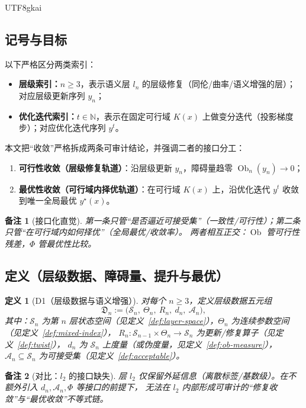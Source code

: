 \documentclass[12pt]{article}
\newtheorem{definition}{定义}[section]
\newtheorem{remark}{备注}[section]
\newcommand{\Ob}{\operatorname{Ob}}
\begin{document}
\begin{CJK*}{UTF8}{gkai}
\subsection{记号与目标}
\label{subsec:double-convergence-notation-goal}

以下严格区分两类索引：
\begin{itemize}
\item \textbf{层级索引：}$n\ge 3$，表示语义层 $l_n$ 的层级修复（同伦/曲率/语义增强的层）；对应层级更新序列 $y_n$；
\item \textbf{优化迭代索引：}$t\in\mathbb N$，表示在固定可行域 $K(x)$ 上做变分迭代（投影梯度步）；对应优化迭代序列 $y^{t}$。
\end{itemize}

本文把“收敛”严格拆成两条可审计结论，并强调二者的接口分工：
\begin{enumerate}
\item \textbf{可行性收敛（层级修复轨道）}：沿层级更新 $y_n$，障碍量趋零 $\Ob_n(y_n)\to 0$；
\item \textbf{最优性收敛（可行域内择优轨道）}：在可行域 $K(x)$ 上，沿优化迭代 $y^{t}$ 收敛到唯一全局最优 $y^\star(x)$。
\end{enumerate}

\begin{remark}[接口化直觉]
第一条只管“是否逼近可接受集”（一致性/可行性）；第二条只管“在可行域内如何择优”（全局最优/收敛率）。
两者相互正交：$\Ob$ 管可行性残差，$\Phi$ 管最优性比较。
\end{remark}

\subsection{定义（层级数据、障碍量、提升与最优）}
\label{subsec:double-convergence-definitions}

\begin{definition}[D1（层级数据与语义增强）]\label{def:dc-D1}
对每个 $n\ge 3$，定义层级数据五元组
\[
\mathfrak D_n := \bigl(\mathcal S_n,\ \Theta_n,\ R_n,\ d_n,\ \mathcal A_n\bigr),
\]
其中：$\mathcal S_n$ 为第 $n$ 层状态空间（见定义~\ref{def:layer-space}），$\Theta_n$ 为连续参数空间（见定义~\ref{def:mixed-index}），
$R_n:\mathcal S_{n-1}\times \Theta_n\to \mathcal S_n$ 为更新/修复算子（见定义~\ref{def:twist}），
$d_n$ 为 $\mathcal S_n$ 上度量（或伪度量，见定义~\ref{def:ob-measure}），
$\mathcal A_n\subseteq \mathcal S_n$ 为可接受集（见定义~\ref{def:acceptable}）。
\end{definition}

\begin{remark}[对比：$l_2$ 的接口缺失]
层 $l_2$ 仅保留外延信息（离散标签/基数级）。在不额外引入 $d_n,\mathcal A_n,\Phi$ 等接口的前提下，
无法在 $l_2$ 内部形成可审计的“修复收敛”与“最优收敛”不等式链。
\end{remark}


\end{CJK*}
\end{document}
